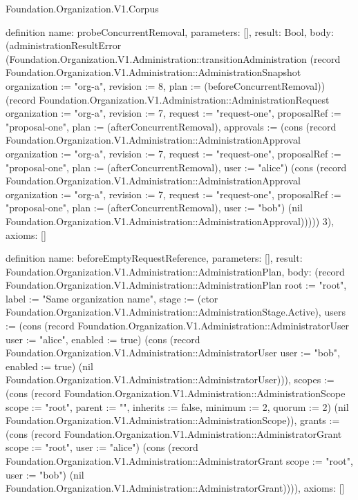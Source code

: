 \begin{lexlean}{Foundation.Organization.V1.Corpus}
\begin{semanticmodule}
definition{
  name: probeConcurrentRemoval,
  parameters: [],
  result: Bool,
  body: (administrationResultError (Foundation.Organization.V1.Administration::transitionAdministration (record Foundation.Organization.V1.Administration::AdministrationSnapshot {organization := "org-a", revision := 8, plan := (beforeConcurrentRemoval)}) (record Foundation.Organization.V1.Administration::AdministrationRequest {organization := "org-a", revision := 7, request := "request-one", proposalRef := "proposal-one", plan := (afterConcurrentRemoval), approvals := (cons (record Foundation.Organization.V1.Administration::AdministrationApproval {organization := "org-a", revision := 7, request := "request-one", proposalRef := "proposal-one", plan := (afterConcurrentRemoval), user := "alice"}) (cons (record Foundation.Organization.V1.Administration::AdministrationApproval {organization := "org-a", revision := 7, request := "request-one", proposalRef := "proposal-one", plan := (afterConcurrentRemoval), user := "bob"}) (nil Foundation.Organization.V1.Administration::AdministrationApproval)))})) 3),
  axioms: []
}

definition{
  name: beforeEmptyRequestReference,
  parameters: [],
  result: Foundation.Organization.V1.Administration::AdministrationPlan,
  body: (record Foundation.Organization.V1.Administration::AdministrationPlan {root := "root", label := "Same organization name", stage := (ctor Foundation.Organization.V1.Administration::AdministrationStage.Active), users := (cons (record Foundation.Organization.V1.Administration::AdministratorUser {user := "alice", enabled := true}) (cons (record Foundation.Organization.V1.Administration::AdministratorUser {user := "bob", enabled := true}) (nil Foundation.Organization.V1.Administration::AdministratorUser))), scopes := (cons (record Foundation.Organization.V1.Administration::AdministrationScope {scope := "root", parent := "", inherits := false, minimum := 2, quorum := 2}) (nil Foundation.Organization.V1.Administration::AdministrationScope)), grants := (cons (record Foundation.Organization.V1.Administration::AdministratorGrant {scope := "root", user := "alice"}) (cons (record Foundation.Organization.V1.Administration::AdministratorGrant {scope := "root", user := "bob"}) (nil Foundation.Organization.V1.Administration::AdministratorGrant)))}),
  axioms: []
}


\end{semanticmodule}
\end{lexlean}
